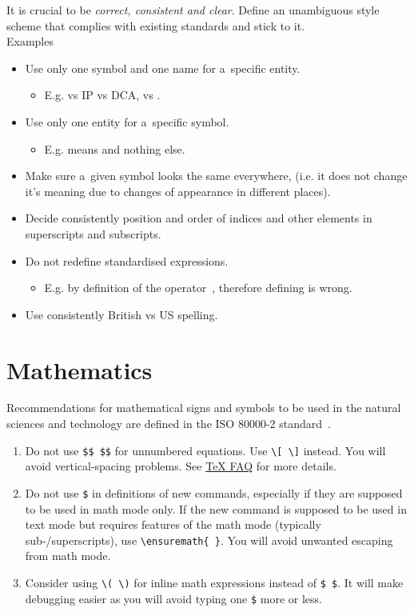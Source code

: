 \documentclass[12pt,a4paper]{article}
\begin{document}
It is crucial to be \emph{correct, consistent and clear}.
Define an unambiguous style scheme that complies with existing standards and stick to it.\\
Examples
\begin{itemize}
\item Use only one symbol and one name for a~specific entity.
    \begin{itemize}
    \item E.g.  vs IP vs DCA,  vs .
    \end{itemize}
\item Use only one entity for a~specific symbol.
    \begin{itemize}
    \item E.g.  means  and nothing else.
    \end{itemize}
\item Make sure a~given symbol looks the same everywhere, (i.e. it does not change it's meaning due to changes of appearance in different places).
\item Decide consistently position and order of indices and other elements in superscripts and subscripts.
\item Do not redefine standardised expressions.
    \begin{itemize}
    \item E.g.  by definition of the \ml{\Dt} operator~\cite{iso-80000-2}, therefore defining  is wrong.
    \end{itemize}
\item Use consistently British vs US spelling.
\end{itemize}

\section{Mathematics}

Recommendations for mathematical signs and symbols to be used in the natural sciences and technology are defined in the ISO 80000-2 standard~\cite{iso-80000-2}.

\begin{enumerate}
\item Do not use \verb_$$ $$_ for unnumbered equations.
Use \verb_\[ \]_ instead.
You will avoid vertical-spacing problems.
See \href{https://texfaq.org/FAQ-dolldoll.html}{\TeX{} FAQ} for more details.

\item Do not use \verb_$_ in definitions of new commands, especially if they are supposed to be used in math mode only.
If the new command is supposed to be used in text mode but requires features of the math mode (typically sub-/superscripts), use \verb_\ensuremath{ }_.
You will avoid unwanted escaping from math mode.

\item Consider using \verb_\( \)_ for inline math expressions instead of \verb_$ $_.
It will make debugging easier as you will avoid typing one \verb!$! more or less.
\end{enumerate}
\end{document}
